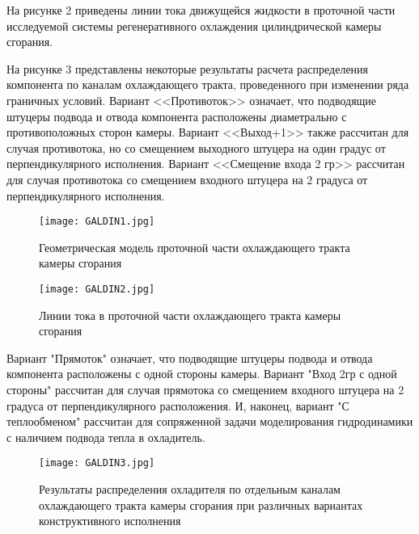 На рисунке 2 приведены линии тока движущейся жидкости в проточной части исследуемой системы регенеративного охлаждения цилиндрической камеры сгорания.

На рисунке 3 представлены некоторые результаты расчета распределения компонента по каналам охлаждающего тракта,
проведенного при изменении ряда граничных условий.
Вариант <<Противоток>> означает,
что подводящие штуцеры подвода и отвода компонента расположены диаметрально с противоположных сторон камеры.
Вариант <<Выход+1>> также рассчитан для случая противотока,
но со смещением выходного штуцера на один градус от перпендикулярного исполнения.
Вариант <<Смещение входа 2 гр>> рассчитан для случая противотока со смещением входного штуцера на 2 градуса от перпендикулярного исполнения.

\begin{figure}
	\centering
	\texttt{[image: GALDIN1.jpg]}
	\caption{Геометрическая модель проточной части охлаждающего тракта камеры сгорания}
\end{figure}

\begin{figure}
	\centering
	\texttt{[image: GALDIN2.jpg]}
	\caption{Линии тока в проточной части охлаждающего тракта камеры сгорания}
\end{figure}

Вариант "Прямоток" означает, что подводящие штуцеры подвода и отвода компонента расположены с одной стороны камеры. Вариант "Вход 2гр с одной стороны" рассчитан для случая прямотока со смещением входного штуцера на 2 градуса от перпендикулярного расположения. И, наконец, вариант "С теплообменом" рассчитан для сопряженной задачи моделирования гидродинамики с наличием подвода тепла в охладитель.
\begin{figure}
	\centering
	\texttt{[image: GALDIN3.jpg]}
	\caption{Результаты распределения охладителя по отдельным каналам охлаждающего тракта камеры сгорания при различных вариантах конструктивного исполнения}
\end{figure}

